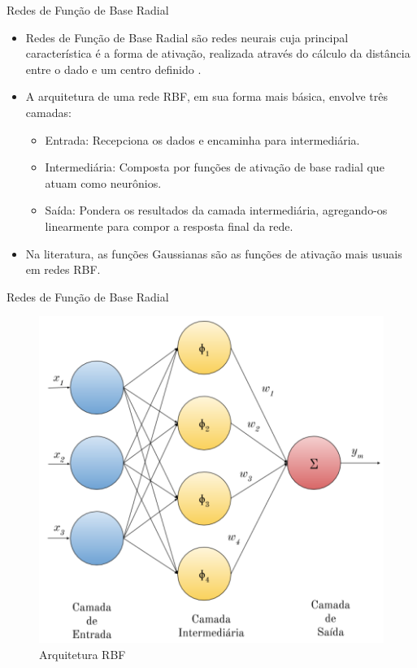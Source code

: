 \documentclass[10pt]{beamer}
\begin{document}

\begin{frame}{Redes de Função de Base Radial}
    \begin{itemize}
        \item<1 -> \alert{Redes de Função de Base Radial} são redes neurais cuja principal característica é a forma de ativação, realizada através do cálculo da distância entre o dado e um centro definido \cite{Braga:RedesNeuraisTeoriaAplicacoes}.
        \item<2 -> A arquitetura de uma rede RBF, em sua forma mais básica, envolve três camadas: 
        \begin{itemize}
            \item<3 -> \alert{Entrada}: Recepciona os dados e encaminha para intermediária.
            \item<4 -> \alert{Intermediária}: Composta por funções de ativação de base radial que atuam como neurônios.
            \item<5 -> \alert{Saída}: Pondera os resultados da camada intermediária, agregando-os linearmente para compor a resposta final da rede.
        \end{itemize}
        \item<6 -> Na literatura, as funções Gaussianas são as funções de ativação mais usuais em redes RBF.
      \end{itemize}
\end{frame}

\begin{frame}{Redes de Função de Base Radial}
    \begin{figure}[H]
    \begin{center}
        \includegraphics[scale=0.6]{../text/imagens/rbf_arq.png}
        \caption{Arquitetura RBF}
        \label{fig:rbg_arq}
    \end{center}
    \end{figure}
\end{frame}
\end{document}
